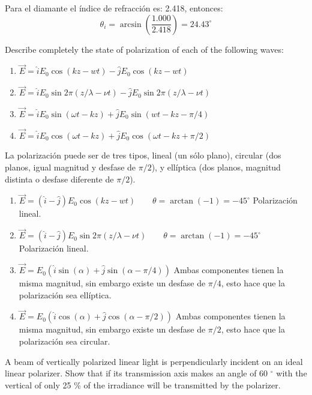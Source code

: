 \documentclass[addpoints,10pt]{exam}
\begin{document}
\begin{questions}
		Para el diamante el \'indice de refracci\'on es: 2.418, entonces:
		\begin{equation}
			\theta_i = \arcsin\left(\dfrac{1.000}{2.418}\right) = 24.43 ^\circ
		\end{equation}

		{
			\question
			Describe completely the state of polarization of each of the following waves:
			\begin{enumerate}
				\item $\vec{E} = \hat{i} E_0\cos(kz-wt) - \hat{j}E_0\cos(kz - wt)$
				\item $\vec{E} = \hat{i}E_0\sin2\pi(z/\lambda - \nu t) - \hat{j}E_0\sin2\pi(z/\lambda - \nu t)$
				\item $\vec{E} = \hat{i}E_0\sin(\omega t -kz) + \hat{j}E_0\sin(wt-kz-\pi/4)$
				\item $\vec{E} = \hat{i}E_0\cos(\omega t - kz) + \hat{j}E_0\cos(\omega t - kz + \pi/2)$
			\end{enumerate}
		}
		
		La polarizaci\'on puede ser de tres tipos, lineal (un s\'olo plano), circular (dos planos, igual magnitud y desfase de $\pi/2$), y ell\'iptica (dos planos, magnitud distinta o desfase diferente de $\pi/2$).
		\begin{enumerate}
			\item $\vec{E} = (\hat{i} - \hat{j})E_0\cos(kz-wt) \qquad \theta = \arctan(-1) = -45^\circ$ Polarizaci\'on lineal.
			\item $\vec{E} = (\hat{i} - \hat{j})E_0\sin2\pi(z/\lambda - \nu t) \qquad \theta = \arctan(-1) = -45^\circ$ Polarizaci\'on lineal.
			
			\item $\vec{E} = E_0\left(\hat{i}\sin(\alpha) + \hat{j}\sin(\alpha - \pi/4)\right)$ Ambas componentes tienen la misma magnitud, sin embargo existe un desfase de $\pi/4$, esto hace que la polarizaci\'on sea ell\'iptica.
			
			\item $\vec{E} =E_0\left(\hat{i}\cos(\alpha) + \hat{j}\cos(\alpha - \pi/2)\right)$ Ambas componentes tienen la misma magnitud, sin embargo existe un desfase de $\pi/2$, esto hace que la polarizaci\'on sea circular.
		\end{enumerate}
		{
			\question
			A beam of vertically polarized linear light is perpendicularly incident on an ideal linear polarizer. Show that if its transmission axis makes an angle of 60 $^\circ$ with the vertical of only 25 \% of the irradiance will be transmitted by the polarizer.
		}
		

\end{questions}
\end{document}
